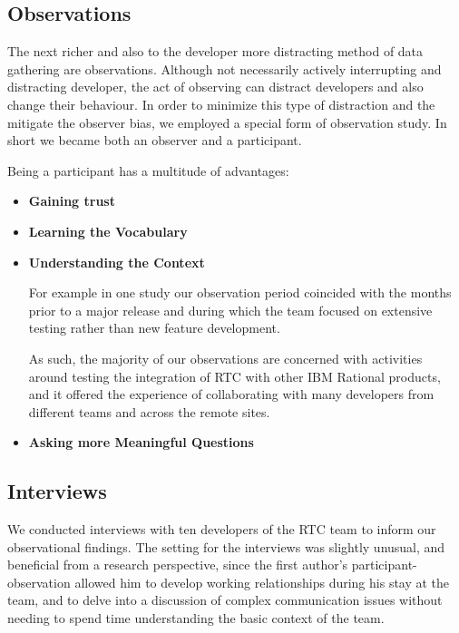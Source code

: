\subsection{Observations}
The next richer and also to the developer more distracting method of data gathering are observations.
Although not necessarily actively interrupting and distracting developer, the act of observing can distract developers and also change their behaviour.
In order to minimize this type of distraction and the mitigate the observer bias, we employed a special form of observation study.
In short we became both an observer and a participant.

Being a participant has a multitude of advantages:
\begin{itemize}
\item\textbf{Gaining trust}
\item\textbf{Learning the Vocabulary}
\item\textbf{Understanding the Context}

For example in one study our observation period coincided with the months prior to a major release and during which the team focused on extensive testing rather than new feature development. 

As such, the majority of our observations are concerned with activities around testing the integration of RTC with other IBM Rational products, and it offered the experience of collaborating with many developers from different teams and across the remote sites.


\item\textbf{Asking more Meaningful Questions}
\end{itemize}





\subsection{Interviews}
We conducted interviews with ten developers of the RTC team to inform our observational findings. The setting for the interviews was slightly unusual, and beneficial from a research perspective, since the first author's participant-observation allowed him to develop working relationships during his stay at the team, and to delve into a discussion of complex communication issues without needing to spend time understanding the basic context of the team.

